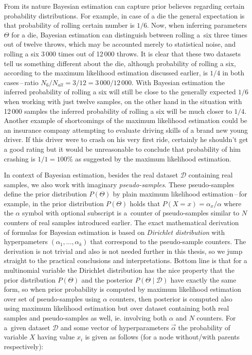 \documentclass[english,cover]{fitthesis} %
\newcommand{\term}[1]{\emph{#1}}           %
\begin{document}
From its nature Bayesian estimation can capture prior believes regarding certain probability distributions. For example, in case of a die the general expectation is that probability of rolling certain number is $1/6$. Now, when inferring parameters $\Theta$ for a die, Bayesian estimation can distinguish between rolling a~six three times out of twelve throws, which may be accounted merely to statistical noise, and rolling a six 3\,000 times out of 12\,000 throws. It is clear that these two datasets tell us something different about the die, although probability of rolling a six, according to the maximum likelihood estimation discussed earlier, is $1/4$ in both cases\,--\,ratio $N_6 / N_{all} = 3/12 = 3\,000/12\,000$. With Bayesian estimation the inferred probability of rolling a six will still be close to the generally expected $1/6$ when working with just twelve samples, on the other hand in the situation with 12\,000 samples the inferred probability of rolling a six will be much closer to $1/4$. Another example of shortcomings of the maximum likelihood estimation could be an insurance company attempting to evaluate driving skills of a brand new young driver. If this driver were to crash on his very first ride, certainly he shouldn't get a good rating but it would be unreasonable to conclude that probability of him crashing is $1/1 = 100 \%$ as suggested by the maximum likelihood estimation.

In context of Bayesian estimation, besides the real dataset $\mathcal{D}$ containing real samples, we also work with imaginary \term{pseudo-samples}. These pseudo-samples define the prior distribution $P(\Theta)$ by plain maximum likelihood estimation\,--\,for example, in the prior distribution $P(\Theta)$ holds that $P(X = x) = \alpha_x / \alpha$ where the $\alpha$ symbol with optional subscript is a~counter of pseudo-samples similar to $N$ counters of real samples introduced earlier. The exact mathematical derivation~\cite[p.~733]{pgm} of formulas for Bayesian estimation is based on \term{Dirichlet distribution} with hyperpameters $(\alpha_1,\dots,\alpha_k)$ that correspond to the pseudo-sample counters. The derivation is not trivial and also is not needed further in this thesis, so we jump straight to the practical conclusions and interpretations. Bottom line is that for a multinomial variable the Dirichlet distribution has the nice property that the prior distribution $P(\Theta)$ and the posterior $P(\Theta \mid \mathcal{D})$ have exactly the same form, so when prior probability is computed by maximum likelihood estimation over set of pseudo-samples using $\alpha$ counters, then posterior is computed also using maximum likelihood estimation but over dataset containing both real samples and pseudo-samples as well, ie. involving both $\alpha$ and $N$ counters. For a~given dataset $\mathcal{D}$ and some vector of hyperparameters $\vec{\alpha}$ the probability of variable $X$ having value $x_i$ is given as follows (for a node without/with parents respectively):
\end{document}
